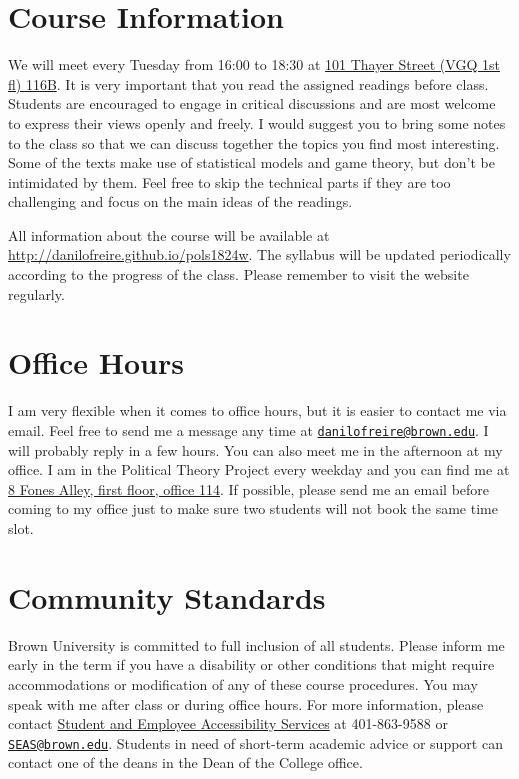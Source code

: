 \documentclass[12pt,]{article}
\begin{document}
\hypertarget{course-information}{%
\section{Course Information}\label{course-information}}

We will meet every Tuesday from 16:00 to 18:30 at
\href{http://brown.edu/Facilities/Facilities_Management/maps/index.php\#building/VGQUADA}{101
Thayer Street (VGQ 1st fl) 116B}. It is very important that you read the
assigned readings before class. Students are encouraged to engage in
critical discussions and are most welcome to express their views openly
and freely. I would suggest you to bring some notes to the class so that
we can discuss together the topics you find most interesting. Some of
the texts make use of statistical models and game theory, but don't be
intimidated by them. Feel free to skip the technical parts if they are
too challenging and focus on the main ideas of the readings.

All information about the course will be available at
\url{http://danilofreire.github.io/pols1824w}. The syllabus will be
updated periodically according to the progress of the class. Please
remember to visit the website regularly.

\hypertarget{office-hours}{%
\section{Office Hours}\label{office-hours}}

I am very flexible when it comes to office hours, but it is easier to
contact me via email. Feel free to send me a message any time at
\href{mailto:danilofreire@brown.edu}{\nolinkurl{danilofreire@brown.edu}}.
I will probably reply in a few hours. You can also meet me in the
afternoon at my office. I am in the Political Theory Project every
weekday and you can find me at \href{https://goo.gl/maps/8WhhyCNDHnw}{8
Fones Alley, first floor, office 114}. If possible, please send me an
email before coming to my office just to make sure two students will not
book the same time slot.

\hypertarget{community-standards}{%
\section{Community Standards}\label{community-standards}}

Brown University is committed to full inclusion of all students. Please
inform me early in the term if you have a disability or other conditions
that might require accommodations or modification of any of these course
procedures. You may speak with me after class or during office hours.
For more information, please contact
\href{https://www.brown.edu/campus-life/support/accessibility-services}{Student
and Employee Accessibility Services} at 401-863-9588 or
\href{mailto:SEAS@brown.edu}{\nolinkurl{SEAS@brown.edu}}. Students in
need of short-term academic advice or support can contact one of the
deans in the Dean of the College office.
\end{document}
